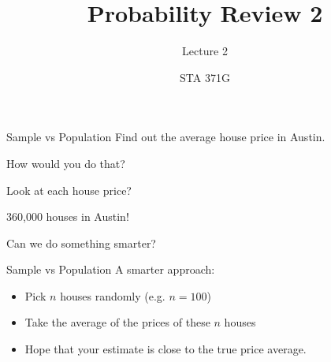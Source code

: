\documentclass{beamer}\usepackage[]{graphicx}\usepackage[]{color}
\title{Probability Review 2}
\subtitle{Lecture 2}
\author{STA 371G}
\begin{document}
  
  

  \frame{\maketitle}



   \begin{darkframes}
  

	\begin{frame}[label=lists]{Sample vs Population}
    	Find out the average house price in Austin. \pause
    	
    	How would you do that? 
    	
		\begin{figure} 
			\centering
			\setlength\fboxsep{0pt}
			\setlength\fboxrule{0.5pt}
		\end{figure}  \pause
			
		
		Look at each house price?  \pause
		
		360,000 houses in Austin!   \pause
		
		Can we do something smarter? 
		
     
      
    \end{frame}    
    
    
    
    \begin{frame}[label=lists]{Sample vs Population}
    	A smarter approach: \pause
   		\begin{itemize}
   			\item Pick $n$ houses randomly (e.g. $n=100$) \pause
   			\item Take the average of the prices of these $n$ houses \pause
   			\item Hope that your estimate is close to the true price average. \pause
   		\end{itemize}
   		

\end{frame}
\end{darkframes}
\end{document}

